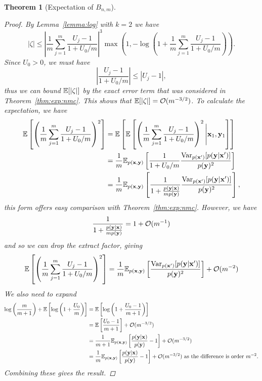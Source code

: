 \documentclass[a4paper, 10pt]{report}
\theoremstyle{plain}
\newtheorem{theorem}{Theorem}[chapter]
\begin{document}
\begin{theorem}[Expectation of $B_{n,m}$]
\begin{proof}
			By Lemma~\ref{lemma:log} with $k=2$ we have
			\begin{equation}
			|\zeta| \le \left| \frac{1}{m}\sum_{j=1}^m \frac{U_j - 1}{1 + U_0/m} \right|^3 \max\left(1, -\log\left(1 + \frac{1}{m} \sum_{j=1}^m \frac{U_j - 1}{1 + U_0/m} \right) \right).
			\end{equation}
			Since $U_0 >0$, we must have
			\begin{equation}
			\left| \frac{U_j - 1}{1 + U_0/m} \right| \le |U_j - 1|,
			\end{equation}
			thus we can bound $\mathbb{E}[|\zeta|]$ by the exact error term that was considered in Theorem~\ref{thm:exp:nmc}.
			This shows that $\mathbb{E}[|\zeta|]=\mathcal{O}(m^{-3/2})$.
			To calculate the expectation, we have 
			\begin{align}
			\mathbb{E}\left[ \left(\frac{1}{m}\sum_{j=1}^m \frac{U_j - 1}{1 + U_0 / m}\right)^2 \right] &= \mathbb{E}\left[\mathbb{E}\left[ \left(\frac{1}{m}\sum_{j=1}^m \frac{U_j - 1}{1 + U_0 / m}\right)^2 \Bigg{|} {\mathbf{x}}_1,{\mathbf{y}}_1 \right]\right] \\
			&= \frac{1}{m}\mathbb{E}_{p({\mathbf{x}},{\mathbf{y}})}\left[ \frac{1}{1 + U_0/m} \frac{\mathrm{Var}_{p({\mathbf{x}}')}[p({\mathbf{y}}|{\mathbf{x}}')]}{p({\mathbf{y}})^2} \right] \\
			&= \frac{1}{m}\mathbb{E}_{p({\mathbf{x}},{\mathbf{y}})}\left[ \frac{1}{1 + \frac{p({\mathbf{y}}|{\mathbf{x}})}{mp({\mathbf{y}})}} \frac{\mathrm{Var}_{p({\mathbf{x}}')}[p({\mathbf{y}}|{\mathbf{x}}')]}{p({\mathbf{y}})^2} \right],
			\end{align}
			this form offers easy comparison with Theorem~\ref{thm:exp:nmc}.
			However, we have 
			\begin{equation}
			\frac{1}{1 + \frac{p({\mathbf{y}}|{\mathbf{x}})}{mp({\mathbf{y}})}} = 1 + \mathcal{O}(m^{-1})
			\end{equation}
			and so we can drop the extract factor, giving 
			\begin{equation}
			\mathbb{E}\left[ \left(\frac{1}{m}\sum_{j=1}^m \frac{U_j - 1}{1 + U_0 / m}\right)^2 \right] = \frac{1}{m}\mathbb{E}_{p({\mathbf{x}},{\mathbf{y}})}\left[  \frac{\mathrm{Var}_{p({\mathbf{x}}')}[p({\mathbf{y}}|{\mathbf{x}}')]}{p({\mathbf{y}})^2} \right] + \mathcal{O}(m^{-2})
			\end{equation}
			We also need to expand
			\begin{align}
			\log \left( \frac{m}{m+1} \right) + \mathbb{E}\left[ \log\left(1 + \frac{U_0}{m} \right) \right] &= \mathbb{E}\left[ \log\left(1 + \frac{U_0-1}{m+1} \right) \right] \\
			&= \mathbb{E}\left[ \frac{U_0 - 1}{m+1} \right] + \mathcal{O}(m^{-3/2}) \\
			&= \frac{1}{m+1}\mathbb{E}_{p({\mathbf{x}},{\mathbf{y}})}\left[ \frac{p({\mathbf{y}}|{\mathbf{x}})}{p({\mathbf{y}})} - 1 \right] + \mathcal{O}(m^{-3/2}) \\
			&= \frac{1}{m}\mathbb{E}_{p({\mathbf{x}},{\mathbf{y}})}\left[ \frac{p({\mathbf{y}}|{\mathbf{x}})}{p({\mathbf{y}})} - 1 \right] + \mathcal{O}(m^{-3/2}) \text{ as the difference is order $m^{-2}$.}
			\end{align}
			Combining these gives the result.
		\end{proof}
	\end{theorem}
	
\end{document}
